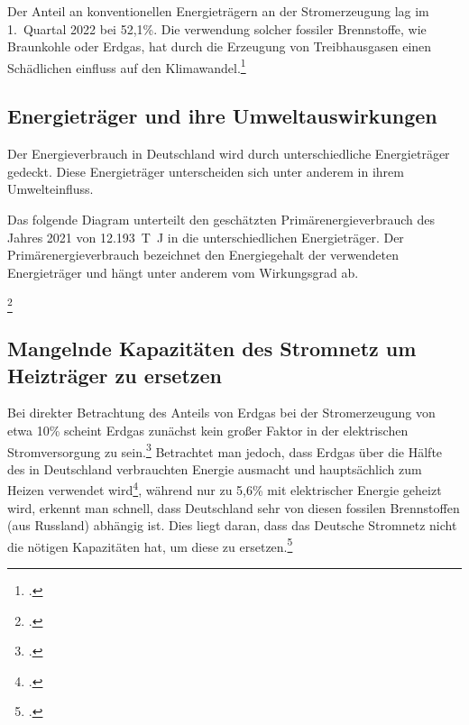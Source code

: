 \documentclass[12pt]{article}
\begin{document}
    Der Anteil an konventionellen Energieträgern an der Stromerzeugung lag im 1.\ Quartal 2022 bei 52,1\%.
    Die verwendung solcher fossiler Brennstoffe, wie Braunkohle oder Erdgas, hat durch die Erzeugung von
    Treibhausgasen einen Schädlichen einfluss auf den Klimawandel.\footcite{wilkeErneuerbareUndKonventionelle2013}

    \subsection{Energieträger und ihre Umweltauswirkungen}
    Der Energieverbrauch in Deutschland wird durch unterschiedliche Energieträger gedeckt.
    Diese Energieträger unterscheiden sich unter anderem in ihrem Umwelteinfluss.

    Das folgende Diagram unterteilt den geschätzten Primärenergieverbrauch des Jahres 2021 von
    \qty{12.193}{T\joule}
    in die unterschiedlichen Energieträger.
    Der Primärenergieverbrauch bezeichnet den Energiegehalt der verwendeten Energieträger und
    hängt unter anderem vom Wirkungsgrad ab.

    \footcite{wilkeEnergieverbrauchNachEnergietraegern2013}




    \subsection{Mangelnde Kapazitäten des Stromnetz um Heizträger zu ersetzen}
    Bei direkter Betrachtung des Anteils von Erdgas bei der Stromerzeugung von etwa 10\% scheint Erdgas zunächst
    kein großer Faktor in der elektrischen Stromversorgung zu sein.\footcite{SMARDHoherEEAnteil, EnergieWofurErdgas}
    Betrachtet man jedoch, dass Erdgas über die Hälfte des in Deutschland verbrauchten
    Energie ausmacht und hauptsächlich zum Heizen verwendet wird\footcite{Anwendungsbereiche, EnergieWofurErdgas},
    während nur zu 5,6\% mit elektrischer Energie geheizt wird, erkennt man schnell, dass Deutschland sehr von diesen
    fossilen Brennstoffen (aus Russland) abhängig ist.
    Dies liegt daran, dass das Deutsche Stromnetz nicht die nötigen Kapazitäten hat, um diese zu
    ersetzen.\footcite{EnergieWofurErdgas}
\end{document}
